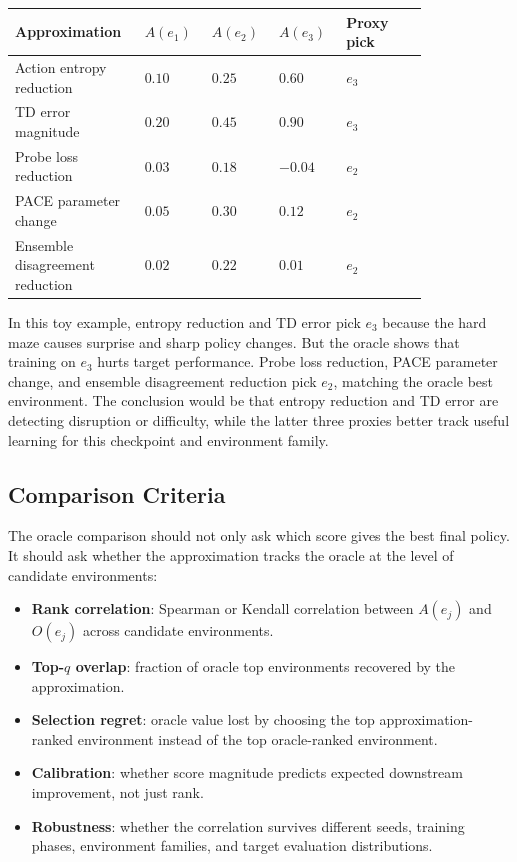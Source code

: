 \documentclass[11pt]{article}
\begin{document}
\begin{center}
\footnotesize
\setlength{\tabcolsep}{3pt}
\begin{tabular}{@{}
  >{\raggedright\arraybackslash}p{0.22\linewidth}
  >{\raggedright\arraybackslash}p{0.14\linewidth}
  >{\raggedright\arraybackslash}p{0.14\linewidth}
  >{\raggedright\arraybackslash}p{0.14\linewidth}
  >{\raggedright\arraybackslash}p{0.18\linewidth}
@{}}
\toprule
Approximation & $A(e_1)$ & $A(e_2)$ & $A(e_3)$ & Proxy pick \\
\midrule
Action entropy reduction & $0.10$ & $0.25$ & $0.60$ & $e_3$ \\
TD error magnitude & $0.20$ & $0.45$ & $0.90$ & $e_3$ \\
Probe loss reduction & $0.03$ & $0.18$ & $-0.04$ & $e_2$ \\
PACE parameter change & $0.05$ & $0.30$ & $0.12$ & $e_2$ \\
Ensemble disagreement reduction & $0.02$ & $0.22$ & $0.01$ & $e_2$ \\
\bottomrule
\end{tabular}
\end{center}

In this toy example, entropy reduction and TD error pick $e_3$ because the hard
maze causes surprise and sharp policy changes. But the oracle shows that
training on $e_3$ hurts target performance. Probe loss reduction, PACE parameter
change, and ensemble disagreement reduction pick $e_2$, matching the oracle
best environment. The conclusion would be that entropy reduction and TD error
are detecting disruption or difficulty, while the latter three proxies better
track useful learning for this checkpoint and environment family.

\subsection{Comparison Criteria}

The oracle comparison should not only ask which score gives the best final
policy. It should ask whether the approximation tracks the oracle at the level
of candidate environments:
\begin{itemize}[leftmargin=*]
  \item \textbf{Rank correlation}: Spearman or Kendall correlation between
  $A(e_j)$ and $O(e_j)$ across candidate environments.
  \item \textbf{Top-$q$ overlap}: fraction of oracle top environments recovered
  by the approximation.
  \item \textbf{Selection regret}: oracle value lost by choosing the top
  approximation-ranked environment instead of the top oracle-ranked
  environment.
  \item \textbf{Calibration}: whether score magnitude predicts expected
  downstream improvement, not just rank.
  \item \textbf{Robustness}: whether the correlation survives different seeds,
  training phases, environment families, and target evaluation distributions.
\end{itemize}
\end{document}
